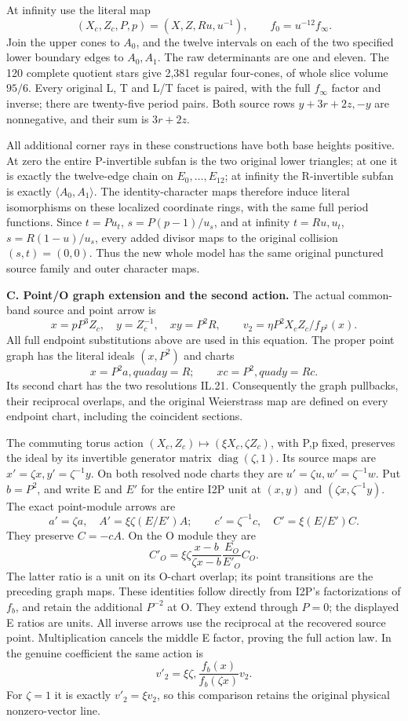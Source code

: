 At infinity use the literal map
\[
(X_c,Z_c,P,p)=(X,Z,Ru,u^{-1}),\qquad f_0=u^{-12}f_\infty.
\]
Join the upper cones to \(A_0\), and the twelve intervals on each of the
two specified lower boundary edges to \(A_0,A_1\).  The raw determinants
are one and eleven.  The 120 complete quotient stars give 2,381 regular
four-cones, of whole slice volume \(95/6\).  Every original L, T and L/T
facet is paired, with the full \(f_\infty\) factor and inverse; there are
twenty-five period pairs.  Both source rows \(y+3r+2z,-y\) are
nonnegative, and their sum is \(3r+2z\).

All additional corner rays in these constructions have both base heights
positive.  At zero the entire P-invertible subfan is the two original lower
triangles; at one it is exactly the twelve-edge chain on
\(E_0,\ldots,E_{12}\); at infinity the R-invertible subfan is exactly
\(\langle A_0,A_1\rangle\).  The identity-character maps therefore induce
literal isomorphisms on these localized coordinate rings, with the same
full period functions.  Since \(t=Pu_t\), \(s=P(p-1)/u_s\), and at
infinity \(t=Ru,u_t\), \(s=R(1-u)/u_s\), every added divisor maps to
the original collision \((s,t)=(0,0)\).  Thus the new whole model has the
same original punctured source family and outer character maps.

\medskip\noindent\textbf{C. Point/O graph extension and the second action.}
The actual common-band source and point arrow is
\[
x=pP^3Z_c,\quad y=Z_c^{-1},\quad xy=P^2R,
\qquad v_2=\eta P^2X_cZ_c/f_{P^2}(x).
\]
All full endpoint substitutions above are used in this equation.  The
proper point graph has the literal ideals \((x,P^2)\) and charts
\[
x=P^2a,quad ay=R;\qquad xc=P^2,quad y=Rc.
\]
Its second chart has the two resolutions IL.21.  Consequently the graph
pullbacks, their reciprocal overlaps, and the original Weierstrass map
are defined on every endpoint chart, including the coincident sections.

The commuting torus action
\((X_c,Z_c)\mapsto(\xi X_c,\zeta Z_c)\), with P,p fixed, preserves the
ideal by its invertible generator matrix \(\operatorname{diag}(\zeta,1)\).
Its source maps are \(x'=\zeta x,y'=\zeta^{-1}y\).  On both resolved
node charts they are \(u'=\zeta u,w'=\zeta^{-1}w\).
Put \(b=P^2\), and write E and \(E'\) for the entire I2P unit at
\((x,y)\) and \((\zeta x,\zeta^{-1}y)\).  The exact point-module arrows are
\[
a'=\zeta a,\quad A'=\xi\zeta(E/E')A;\qquad
c'=\zeta^{-1}c,\quad C'=\xi(E/E')C.
\]
They preserve \(C=-cA\).  On the O module they are
\[
C'_O=\xi\zeta\frac{x-b}{\zeta x-b}\frac{E_O}{E'_O}C_O.
\]
The latter ratio is a unit on its O-chart overlap; its point transitions
are the preceding graph maps.  These identities follow directly from
I2P's factorizations of \(f_b\), and retain the additional \(P^{-2}\)
at O.  They extend through \(P=0\); the displayed E ratios are units.
All inverse arrows use the reciprocal at the recovered source point.
Multiplication cancels the middle E factor, proving the full action law.
In the genuine coefficient the same action is
\[
v'_2=\xi\zeta,\frac{f_b(x)}{f_b(\zeta x)}v_2.
\]
For \(\zeta=1\) it is exactly \(v'_2=\xi v_2\), so this comparison
retains the original physical nonzero-vector line.

